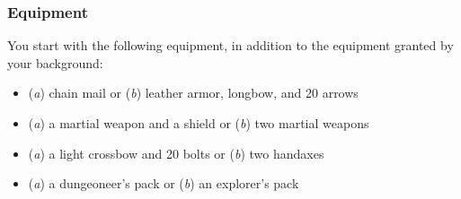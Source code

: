 \subsubsection{Equipment}

You start with the following equipment, in addition to the equipment granted by your background:

\begin{itemize}
\item (\textit{a}) chain mail or (\textit{b}) leather armor, longbow, and 20 arrows
\item (\textit{a}) a martial weapon and a shield or (\textit{b}) two martial weapons
\item (\textit{a}) a light crossbow and 20 bolts or (\textit{b}) two handaxes
\item (\textit{a}) a dungeoneer's pack or (\textit{b}) an explorer's pack
\end{itemize}

